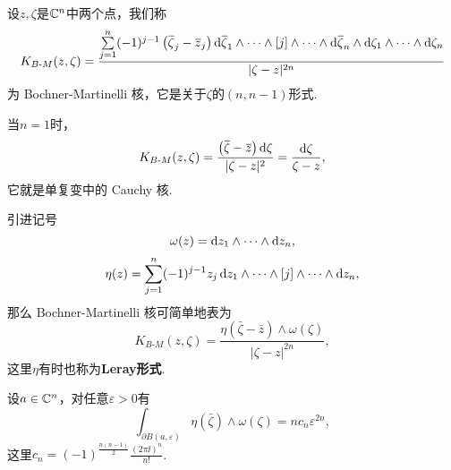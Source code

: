 设$z,\zeta$是$\mathbb C^n$中两个点，我们称
\[K_{B\text{-}M}(z,\zeta)=\frac{\sum\limits_{j=1}^n (-1)^{j-1}\left({}\mkern1mu\overline{\mkern-1mu\zeta}_j-{}\mkern1mu\overline{\mkern-1muz}_j\right)\mathop{}\!\mathrm{d}{}\mkern1mu\overline{\mkern-1mu\zeta}_1\wedge\cdots\wedge[j]\wedge\cdots\wedge\mathop{}\!\mathrm{d}{}\mkern1mu\overline{\mkern-1mu\zeta}_n\wedge\mathop{}\!\mathrm{d}\zeta_1\wedge\cdots\wedge\mathop{}\!\mathrm{d}\zeta_n}{|\zeta-z|^{2n}}\]
为 Bochner-Martinelli 核，它是关于$\zeta$的$(n,n-1)$形式.

当$n=1$时，
\[K_{B\text{-}M}(z,\zeta)=\frac{\left({}\mkern1mu\overline{\mkern-1mu\zeta}-{}\mkern1mu\overline{\mkern-1muz}\right)\mathop{}\!\mathrm{d}\zeta}{|\zeta-z|^2}=\frac{\mathop{}\!\mathrm{d}\zeta}{\zeta-z},\]
它就是单复变中的 Cauchy 核.

引进记号
\[\omega(z)=\mathop{}\!\mathrm dz_1\wedge\cdots\wedge\mathop{}\!\mathrm dz_n,\]
\[\eta(z)=\sum_{j=1}^{n}(-1)^{j-1}z_j\mathop{}\!\mathrm dz_1\wedge\cdots\wedge[j]\wedge\cdots\wedge\mathop{}\!\mathrm dz_n,\]
那么 Bochner-Martinelli 核可简单地表为
\[K_{B\text{-}M}(z,\zeta)=\frac{\eta\left(\bar{\zeta}-\bar{z}\right)\wedge\omega(\zeta)}{|\zeta-z|^{2n}},\]
这里$\eta$有时也称为\textbf{Leray形式}.
\begin{lemma}\label{lem4.8.1}
	设$a\in\mathbb C^n$，对任意$\varepsilon>0$有
	\begin{equation}\label{eq4.8.1}
		\int_{\partial B(a,\varepsilon)} \eta\left(\bar{\zeta}\right)\wedge\omega(\zeta)=n c_n \varepsilon^{2n},
	\end{equation}
这里$c_n=(-1)^{\frac{n(n-1)}{2}}\frac{(2\pi\ii)^n}{n!}$.
\end{lemma}
